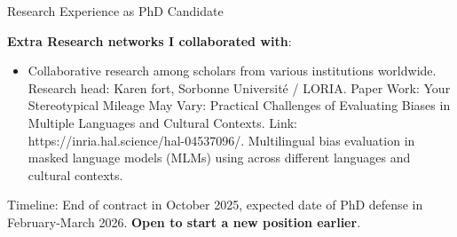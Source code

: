 \begin{rubric}{Research Experience as PhD Candidate}
{\textbf{Extra Research networks I collaborated with}:
    \begin{itemize}
        \item Collaborative research among scholars from various institutions worldwide. Research head: Karen fort, Sorbonne Université / LORIA. Paper Work: Your Stereotypical Mileage May Vary: Practical Challenges of Evaluating Biases in Multiple Languages and Cultural Contexts. Link: https://inria.hal.science/hal-04537096/. Multilingual bias evaluation in masked language models (MLMs) using across different languages and cultural contexts.
    \end{itemize}

Timeline: 
End of contract in October 2025, expected date of PhD defense in February-March 2026. \textbf{Open to start a new position earlier}. 
}
\end{rubric}